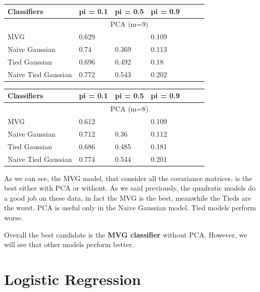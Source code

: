 \documentclass[english]{report}
\begin{document}
\begin{table}[H]
    \centering
    \begin{tabular}{@{}lllllll@{}}
    \toprule
    Classifiers         & pi = 0.1 & pi = 0.5 & pi = 0.9 \\ \midrule
                        & \multicolumn{3}{c}{PCA (m=9)}  \\ \midrule
    MVG                 & 0.629    & \color{red}{0.33}    & 0.109    \\
    Naive Gaussian      & 0.74    & 0.369    & 0.113    \\
    Tied Gaussian       & 0.696    & 0.492    & 0.18    \\
    Naive Tied Gaussian & 0.772    & 0.543    & 0.202    \\ \bottomrule
    \end{tabular}
    \label{tab:MVG_PCA9_valid}
\end{table}

\begin{table}[H]
    \centering
    \begin{tabular}{@{}lllllll@{}}
    \toprule
    Classifiers         & pi = 0.1 & pi = 0.5 & pi = 0.9 \\ \midrule
                        & \multicolumn{3}{c}{PCA (m=8)}  \\ \midrule
    MVG                 & 0.612    & \color{red}{0.333}    & 0.109    \\
    Naive Gaussian      & 0.712     & 0.36    & 0.112    \\
    Tied Gaussian       & 0.686    & 0.485    & 0.181    \\
    Naive Tied Gaussian & 0.774    & 0.544    & 0.201    \\ \bottomrule
    \end{tabular}
    \label{tab:MVG_PCA8_valid}
\end{table}

As we can see, the MVG model, that consider all the covariance matrices, is the best either with PCA or without.
As we said previously, the quadratic models do a good job on these data, in fact the MVG is the best, meanwhile the Tieds are the worst.
PCA is useful only in the Naive Gaussian model.
Tied models perform worse.

Overall the best candidate is the \textbf{MVG classifier} without PCA. However, we will see that other models
perform better.

\clearpage

\section{Logistic Regression}
\end{document}
